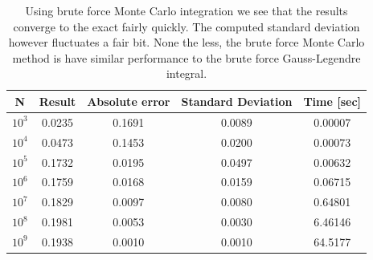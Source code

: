 \documentclass[intlimits]{amsart}
\begin{document}
\begin{table}[p]
  \centering
  \caption{Using brute force Monte Carlo integration we see that the results
  converge to the exact fairly quickly. The computed standard deviation however
fluctuates a fair bit. None the less, the brute force Monte Carlo method is
have similar performance to the brute force Gauss-Legendre integral.}
  \label{tab:MC_brute}
  \begin{tabular}{ccccc}
    N & Result & Absolute error & Standard Deviation & Time [sec]\\
    \hline\hline
    $10^3$ &0.0235 &0.1691 &0.0089 &0.00007\\
    $10^4$ &0.0473 &0.1453 &0.0200 &0.00073\\
    $10^5$ &0.1732 &0.0195 &0.0497 &0.00632\\
    $10^6$ &0.1759 &0.0168 &0.0159 &0.06715\\
    $10^7$ &0.1829 &0.0097 &0.0080 &0.64801\\
    $10^8$ &0.1981 &0.0053 &0.0030 &6.46146\\
    $10^9$ &0.1938 &0.0010 &0.0010 &64.5177\\
    \hline
  \end{tabular}
\end{table}
\end{document}
